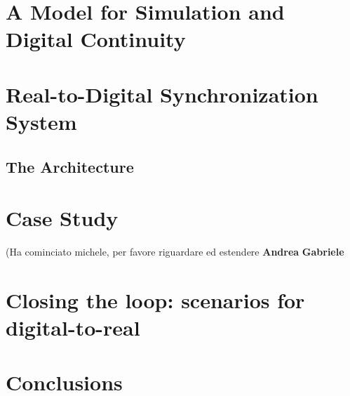 \documentclass{riverk}
\begin{document}
\section{A Model for Simulation and Digital Continuity}\label{sec:model}




\section{Real-to-Digital Synchronization System}\label{sec:r2ds}


\subsection{The Architecture}\label{sec:architecture}




\section{Case Study}\label{sec:caseStudy}
(Ha cominciato michele, per favore riguardare ed estendere \textbf{Andrea} \textbf{Gabriele}


\section{Closing the loop: scenarios for digital-to-real}\label{sec:d2rs}


\section{Conclusions}\label{sec:conclusions}







\end{document}
